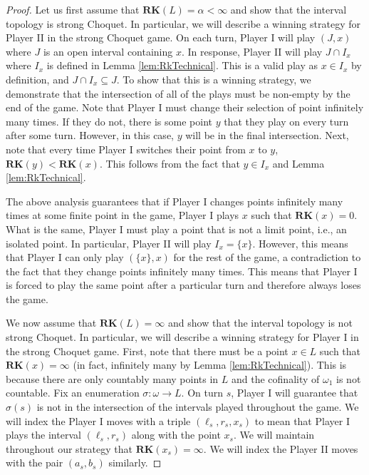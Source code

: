 \documentclass[11pt]{amsart}
\theoremstyle{remark}
\def\RK{\textbf{RK}}
\begin{document}
\begin{proof}
Let us first assume that  $\RK(L)=\alpha<\infty$ and show that the interval topology is strong Choquet.
In particular, we will describe a winning strategy for Player II in the strong Choquet game.
On each turn, Player I will play $(J,x)$ where $J$ is an open interval containing $x$.
In response, Player II will play $J\cap I_x$ where $I_x$ is defined in Lemma \ref{lem:RkTechnical}.
This is a valid play as $x\in I_x$ by definition, and $J\cap I_x\subseteq J$.
To show that this is a winning strategy, we demonstrate that the intersection of all of the plays must be non-empty by the end of the game.
Note that Player I must change their selection of point infinitely many times.
If they do not, there is some point $y$ that they play on every turn after some turn.
However, in this case, $y$ will be in the final intersection.
Next, note that every time Player I switches their point from $x$ to $y$, $\RK(y)<\RK(x)$.
This follows from the fact that $y\in I_x$ and Lemma \ref{lem:RkTechnical}.

The above analysis guarantees that if Player I changes points infinitely many times at some finite point in the game, Player I plays $x$ such that $\RK(x)=0$.
What is the same, Player I must play a point that is not a limit point, i.e., an isolated point.
In particular, Player II will play $I_x = \{x\}$.
However, this means that Player I can only play $(\{x\},x)$ for the rest of the game, a contradiction to the fact that they change points infinitely many times.
This means that Player I is forced to play the same point after a particular turn and therefore always loses the game.


We now assume that $\RK(L)=\infty$ and show that the interval topology is not strong Choquet.
In particular, we will describe a winning strategy for Player I in the strong Choquet game.
First, note that there must be a point $x\in L$ such that $\RK(x)=\infty$ (in fact, infinitely many by Lemma \ref{lem:RkTechnical}).
This is because there are only countably many points in $L$ and the cofinality of $\omega_1$ is not countable.
Fix an enumeration $\sigma:\omega\to L$.
On turn $s$, Player I will guarantee that $\sigma(s)$ is not in the intersection of the intervals played throughout the game.
We will index the Player I moves with a triple $(\ell_s,r_s,x_s)$ to mean that Player I plays the interval $(\ell_s,r_s)$ along with the point $x_s$.
We will maintain throughout our strategy that $\RK(x_s)=\infty$.
We will index the Player II moves with the pair $(a_s,b_s)$ similarly.


\end{proof}
\end{document}
